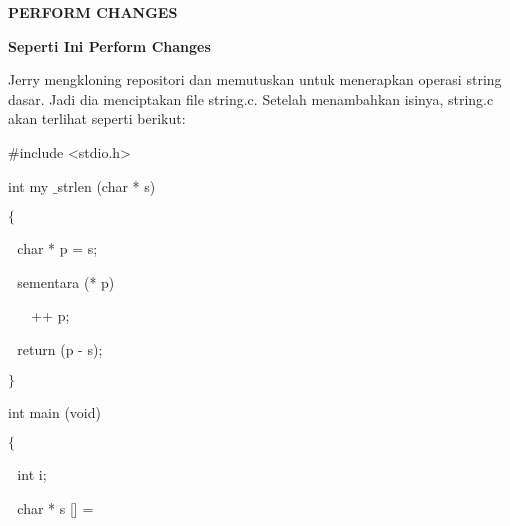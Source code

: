 \vspace{14pt}
\noindent 
\begin{center}{\fontsize{14pt}{14pt}\selectfont \textbf{PERFORM CHANGES} \\}\end{center} \par
\vspace{14pt}
\noindent 
{\fontsize{14pt}{14pt}\selectfont \textbf{Seperti Ini Perform Changes} \\} \par
\noindent 
 \hspace*{0.5in} Jerry mengkloning repositori dan memutuskan untuk menerapkan operasi string dasar. Jadi dia menciptakan file string.c. Setelah menambahkan isinya, string.c akan terlihat seperti berikut: \par
\vspace{12pt}
\noindent 
 \hspace*{0.5in}  $  \#  $include <stdio.h> \par
\noindent 
 \hspace*{0.5in} int my $  \_  $strlen (char * s) \hspace*{0.5in}  \par
\noindent 
 \hspace*{0.5in}  $  \{  $ \par
\noindent 
 \hspace*{0.5in}  $  $ $  $ $  $char * p = s; \par
\vspace{12pt}
\noindent 
 \hspace*{0.5in}  $  $ $  $ $  $sementara (* p) \par
\noindent 
 \hspace*{0.5in}  $  $ $  $ $  $ $  $ $  $ $  $++ p; \par
\noindent 
 \hspace*{0.5in}  $  $ $  $ $  $return (p - s); \par
\noindent 
 \hspace*{0.5in}  $  \}  $ \par
\noindent 
 \hspace*{0.5in} int main (void) \par
\vspace{12pt}
\noindent 
 \hspace*{0.5in}  $  \{  $ \par
\noindent 
 \hspace*{0.5in}  $  $ $  $ $  $int i; \par
\noindent 
 \hspace*{0.5in}  $  $ $  $ $  $char * s [] = \par
